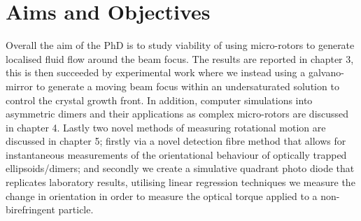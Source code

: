 \section{Aims and Objectives}
Overall the aim of the PhD is to study viability of using micro-rotors to
generate localised fluid flow around the beam focus. The results are reported
in chapter 3, this is then succeeded by experimental work where we 
instead using a galvano-mirror to generate a moving beam focus within an 
undersaturated solution to control the crystal growth front. In addition,
computer simulations into asymmetric dimers and their applications as complex
micro-rotors are discussed in chapter 4. Lastly two novel methods of measuring
rotational motion are discussed in chapter 5; firstly via a novel detection
fibre method that allows for instantaneous measurements of the orientational
behaviour of optically trapped ellipsoids/dimers; and secondly we create 
a simulative quadrant photo diode that replicates laboratory results, utilising 
linear regression techniques we measure the change in orientation in order to
measure the optical torque applied to a non-birefringent particle. 
